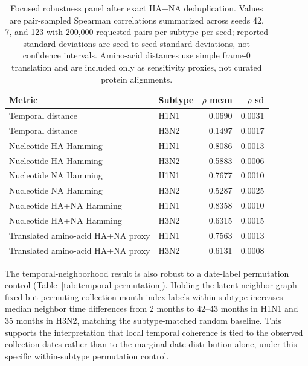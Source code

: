 \documentclass[11pt]{article}
\begin{document}
\begin{table}[H]
\centering
\caption{Focused robustness panel after exact HA+NA deduplication. Values are pair-sampled Spearman correlations summarized across seeds 42, 7, and 123 with 200,000 requested pairs per subtype per seed; reported standard deviations are seed-to-seed standard deviations, not confidence intervals. Amino-acid distances use simple frame-0 translation and are included only as sensitivity proxies, not curated protein alignments.}
\label{tab:robust-spearman}
\begin{tabular}{llrr}
\toprule
Metric & Subtype & $\rho$ mean & $\rho$ sd \\
\midrule
Temporal distance & H1N1 & 0.0690 & 0.0031 \\
Temporal distance & H3N2 & 0.1497 & 0.0017 \\
Nucleotide HA Hamming & H1N1 & 0.8086 & 0.0013 \\
Nucleotide HA Hamming & H3N2 & 0.5883 & 0.0006 \\
Nucleotide NA Hamming & H1N1 & 0.7677 & 0.0010 \\
Nucleotide NA Hamming & H3N2 & 0.5287 & 0.0025 \\
Nucleotide HA+NA Hamming & H1N1 & 0.8358 & 0.0010 \\
Nucleotide HA+NA Hamming & H3N2 & 0.6315 & 0.0015 \\
Translated amino-acid HA+NA proxy & H1N1 & 0.7563 & 0.0013 \\
Translated amino-acid HA+NA proxy & H3N2 & 0.6131 & 0.0008 \\
\bottomrule
\end{tabular}
\end{table}

The temporal-neighborhood result is also robust to a date-label permutation control (Table~\ref{tab:temporal-permutation}). Holding the latent neighbor graph fixed but permuting collection month-index labels within subtype increases median neighbor time differences from 2 months to 42--43 months in H1N1 and 35 months in H3N2, matching the subtype-matched random baseline. This supports the interpretation that local temporal coherence is tied to the observed collection dates rather than to the marginal date distribution alone, under this specific within-subtype permutation control.
\end{document}
